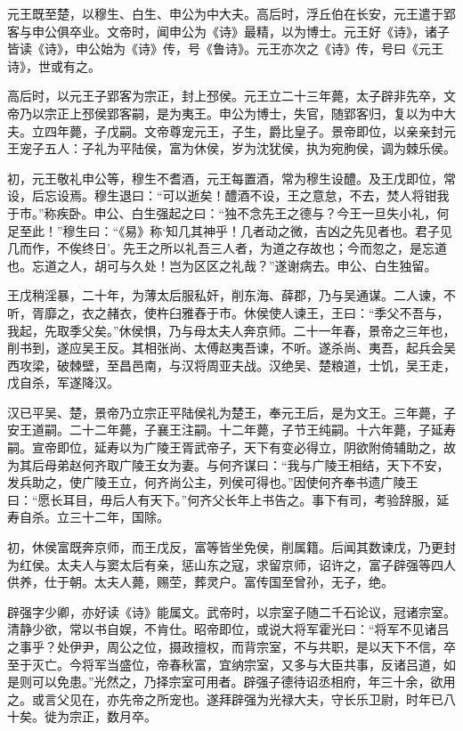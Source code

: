 \documentclass[12pt,UTF8]{ctexbook}
\begin{document}
元王既至楚，以穆生、白生、申公为中大夫。高后时，浮丘伯在长安，元王遣于郢客与申公俱卒业。文帝时，闻申公为《诗》最精，以为博士。元王好《诗》，诸子皆读《诗》，申公始为《诗》传，号《鲁诗》。元王亦次之《诗》传，号曰《元王诗》，世或有之。



高后时，以元王子郢客为宗正，封上邳侯。元王立二十三年薨，太子辟非先卒，文帝乃以宗正上邳侯郢客嗣，是为夷王。申公为博士，失官，随郢客归，复以为中大夫。立四年薨，子戊嗣。文帝尊宠元王，子生，爵比皇子。景帝即位，以亲亲封元王宠子五人：子礼为平陆侯，富为休侯，岁为沈犹侯，执为宛朐侯，调为棘乐侯。



初，元王敬礼申公等，穆生不耆酒，元王每置酒，常为穆生设醴。及王戊即位，常设，后忘设焉。穆生退曰：“可以逝矣！醴酒不设，王之意怠，不去，焚人将钳我于市。”称疾卧。申公、白生强起之曰：“独不念先王之德与？今王一旦失小礼，何足至此！”穆生曰：“《易》称‘知几其神乎！几者动之微，吉凶之先见者也。君子见几而作，不俟终日’。先王之所以礼吾三人者，为道之存故也；今而忽之，是忘道也。忘道之人，胡可与久处！岂为区区之礼哉？”遂谢病去。申公、白生独留。



王戊稍淫暴，二十年，为薄太后服私奸，削东海、薛郡，乃与吴通谋。二人谏，不听，胥靡之，衣之赭衣，使杵臼雅舂于市。休侯使人谏王，王曰：“季父不吾与，我起，先取季父矣。”休侯惧，乃与母太夫人奔京师。二十一年春，景帝之三年也，削书到，遂应吴王反。其相张尚、太傅赵夷吾谏，不听。遂杀尚、夷吾，起兵会吴西攻梁，破棘壁，至昌邑南，与汉将周亚夫战。汉绝吴、楚粮道，士饥，吴王走，戊自杀，军遂降汉。



汉已平吴、楚，景帝乃立宗正平陆侯礼为楚王，奉元王后，是为文王。三年薨，子安王道嗣。二十二年薨，子襄王注嗣。十二年薨，子节王纯嗣。十六年薨，子延寿嗣。宣帝即位，延寿以为广陵王胥武帝子，天下有变必得立，阴欲附倚辅助之，故为其后母弟赵何齐取广陵王女为妻。与何齐谋曰：“我与广陵王相结，天下不安，发兵助之，使广陵王立，何齐尚公主，列侯可得也。”因使何齐奉书遗广陵王曰：“愿长耳目，毋后人有天下。”何齐父长年上书告之。事下有司，考验辞服，延寿自杀。立三十二年，国除。



初，休侯富既奔京师，而王戊反，富等皆坐免侯，削属籍。后闻其数谏戊，乃更封为红侯。太夫人与窦太后有亲，惩山东之寇，求留京师，诏许之，富子辟强等四人供养，仕于朝。太夫人薨，赐茔，葬灵户。富传国至曾孙，无子，绝。



辟强字少卿，亦好读《诗》能属文。武帝时，以宗室子随二千石论议，冠诸宗室。清静少欲，常以书自娱，不肯仕。昭帝即位，或说大将军霍光曰：“将军不见诸吕之事乎？处伊尹，周公之位，摄政擅权，而背宗室，不与共职，是以天下不信，卒至于灭亡。今将军当盛位，帝春秋富，宜纳宗室，又多与大臣共事，反诸吕道，如是则可以免患。”光然之，乃择宗室可用者。辟强子德待诏丞相府，年三十余，欲用之。或言父见在，亦先帝之所宠也。遂拜辟强为光禄大夫，守长乐卫尉，时年已八十矣。徙为宗正，数月卒。
\end{document}
